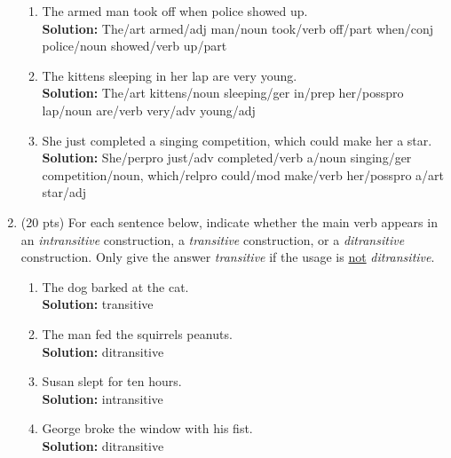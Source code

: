 \documentclass[11pt]{article}
\begin{document}
\begin{enumerate}
\begin{enumerate}
\item The armed man took off when police showed up.  \\
\textbf{Solution:} The/{\sc art} armed/{\sc adj} man/{\sc noun} took/{\sc verb} off/{\sc part} when/{\sc conj} police/{\sc noun} showed/{\sc verb} up/{\sc part}  \\


\item The kittens sleeping in her lap are very young.   \\
\textbf{Solution:} The/{\sc art} kittens/{\sc noun} sleeping/{\sc ger} in/{\sc prep} her/{\sc posspro} lap/{\sc noun} are/{\sc verb} very/{\sc adv} young/{\sc adj}  \\

\item She just completed a singing competition, which could make her a star.  \\
\textbf{Solution:} She/{\sc perpro} just/{\sc adv} completed/{\sc verb} a/{\sc noun} singing/{\sc ger} competition/{\sc noun}, which/{\sc relpro} could/{\sc mod} make/{\sc verb} her/{\sc posspro} a/{\sc art} star/{\sc adj} \\


\end{enumerate}



\newpage
\item (20 pts) For each sentence below, indicate whether the main verb
  appears in an {\it intransitive} construction, a {\it transitive}
  construction, or a {\it ditransitive} construction. Only give the
  answer {\it transitive} if the   usage is \underline{not} {\it ditransitive}.

\begin{enumerate}

\item The dog barked at the cat. \\
\textbf{Solution:} transitive\\

\item The man fed the squirrels peanuts.  \\
\textbf{Solution:} ditransitive\\

\item Susan slept for ten hours. \\
\textbf{Solution:} intransitive\\

\item George broke the window with his fist. \\
\textbf{Solution:} ditransitive\\


\end{enumerate}
\end{enumerate}
\end{document}
